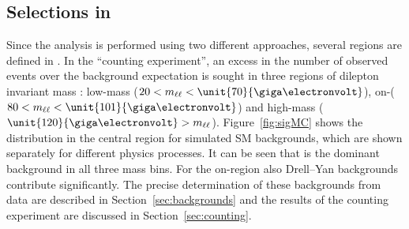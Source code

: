 \subsection{Selections in \mll}
Since the analysis is performed using two different approaches, several regions are defined in \mll. In the ``counting experiment'', an excess in the number of observed events over the background expectation is sought in three regions of dilepton invariant mass \mll: low-mass ($\mathrm{20}< \mll < \unit{70}{\giga\electronvolt}$), on-\Z ($\mathrm{80}< \mll < \unit{101}{\giga\electronvolt}$) and high-mass ($\unit{120}{\giga\electronvolt} > \mll$). Figure~\ref{fig:sigMC} shows the \mll distribution in the central region for simulated SM backgrounds, which are shown separately for different physics processes. It can be seen that \ttbar is the dominant background in all three mass bins. For the on-\Z region also Drell--Yan backgrounds contribute significantly. The precise determination of these backgrounds from data are described in Section~\ref{sec:backgrounds} and the results of the counting experiment are discussed in Section~\ref{sec:counting}.

